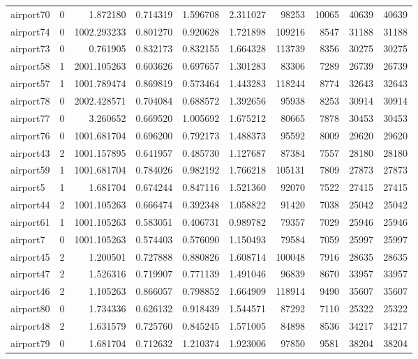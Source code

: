 \documentclass[../../../thesis.tex]{subfiles}
\begin{document}
\begin{longtable}{|l|r|r|r|r|r|r|r|r|r|}
airport70 & 0 & 1.872180 & 0.714319 & 1.596708 & 2.311027 & 98253 & 10065 & 40639 & 40639 \\
airport74 & 0 & 1002.293233 & 0.801270 & 0.920628 & 1.721898 & 109216 & 8547 & 31188 & 31188 \\
airport73 & 0 & 0.761905 & 0.832173 & 0.832155 & 1.664328 & 113739 & 8356 & 30275 & 30275 \\
airport58 & 1 & 2001.105263 & 0.603626 & 0.697657 & 1.301283 & 83306 & 7289 & 26739 & 26739 \\
airport57 & 1 & 1001.789474 & 0.869819 & 0.573464 & 1.443283 & 118244 & 8774 & 32643 & 32643 \\
airport78 & 0 & 2002.428571 & 0.704084 & 0.688572 & 1.392656 & 95938 & 8253 & 30914 & 30914 \\
airport77 & 0 & 3.260652 & 0.669520 & 1.005692 & 1.675212 & 80665 & 7878 & 30453 & 30453 \\
airport76 & 0 & 1001.681704 & 0.696200 & 0.792173 & 1.488373 & 95592 & 8009 & 29620 & 29620 \\
airport43 & 2 & 1001.157895 & 0.641957 & 0.485730 & 1.127687 & 87384 & 7557 & 28180 & 28180 \\
airport59 & 1 & 1001.681704 & 0.784026 & 0.982192 & 1.766218 & 105131 & 7809 & 27873 & 27873 \\
airport5 & 1 & 1.681704 & 0.674244 & 0.847116 & 1.521360 & 92070 & 7522 & 27415 & 27415 \\
airport44 & 2 & 1001.105263 & 0.666474 & 0.392348 & 1.058822 & 91420 & 7038 & 25042 & 25042 \\
airport61 & 1 & 1001.105263 & 0.583051 & 0.406731 & 0.989782 & 79357 & 7029 & 25946 & 25946 \\
airport7 & 0 & 1001.105263 & 0.574403 & 0.576090 & 1.150493 & 79584 & 7059 & 25997 & 25997 \\
airport45 & 2 & 1.200501 & 0.727888 & 0.880826 & 1.608714 & 100048 & 7916 & 28635 & 28635 \\
airport47 & 2 & 1.526316 & 0.719907 & 0.771139 & 1.491046 & 96839 & 8670 & 33957 & 33957 \\
airport46 & 2 & 1.105263 & 0.866057 & 0.798852 & 1.664909 & 118914 & 9490 & 35607 & 35607 \\
airport80 & 0 & 1.734336 & 0.626132 & 0.918439 & 1.544571 & 87292 & 7110 & 25322 & 25322 \\
airport48 & 2 & 1.631579 & 0.725760 & 0.845245 & 1.571005 & 84898 & 8536 & 34217 & 34217 \\
airport79 & 0 & 1.681704 & 0.712632 & 1.210374 & 1.923006 & 97850 & 9581 & 38204 & 38204 \\

\end{longtable}
\end{document}
